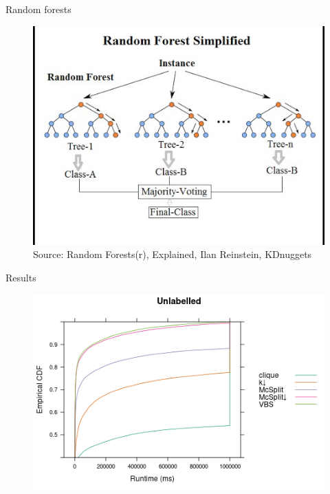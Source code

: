 \documentclass{beamer}
\begin{document}
\begin{frame}{Random forests \parencite{DBLP:journals/ml/Breiman01}}
  \begin{figure}
    \centering
    \includegraphics[scale=0.5]{rand-forest-1.jpg} \\
    {\tiny\color{gray}Source: Random Forests(r), Explained, Ilan Reinstein, KDnuggets}
  \end{figure}
\end{frame}

\begin{frame}{Results}
  \begin{figure}
    \centering
    \includegraphics[width=\textwidth]{../dissertation/images/ecdf_unlabelled.png}
  \end{figure}
\end{frame}
\end{document}
